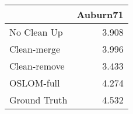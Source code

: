 \begin{tabular}{lr}
\toprule
{} & Auburn71 \\
\midrule
No Clean Up  &    3.908 \\
Clean-merge  &    3.996 \\
Clean-remove &    3.433 \\
OSLOM-full   &    4.274 \\
Ground Truth &    4.532 \\
\bottomrule
\end{tabular}
